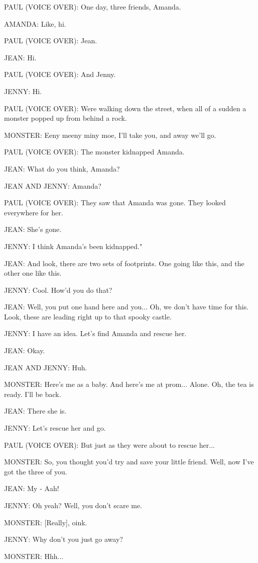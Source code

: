 PAUL (VOICE OVER):
One day, three friends, Amanda.

AMANDA:
Like, hi.

PAUL (VOICE OVER):
Jean.

JEAN:
Hi.

PAUL (VOICE OVER):
And Jenny.

JENNY:
Hi.

PAUL (VOICE OVER):
Were walking down the street, when all of a sudden a monster popped up from behind a rock.

MONSTER:
Eeny meeny miny moe, I'll take you, and away we'll go.

PAUL (VOICE OVER):
The monster kidnapped Amanda.

JEAN:
What do you think, Amanda?

JEAN AND JENNY:
Amanda?

PAUL (VOICE OVER):
They saw that Amanda was gone.
They looked everywhere for her.

JEAN:
She's gone.

JENNY:
I think Amanda's been kidnapped."

JEAN:
And look, there are two sets of footprints.
One going like this, and the other one like this.

JENNY:
Cool. How'd you do that?

JEAN:
Well, you put one hand here and you...
Oh, we don't have time for this.
Look, these are leading right up to that spooky castle.

JENNY:
I have an idea.
Let's find Amanda and rescue her.

JEAN:
Okay.

JEAN AND JENNY:
Huh.

MONSTER:
Here's me as a baby.
And here's me at prom... Alone.
Oh, the tea is ready.
I'll be back.

JEAN:
There she is.

JENNY:
Let's rescue her and go.

PAUL (VOICE OVER):
But just as they were about to rescue her...

MONSTER:
So, you thought you'd try and save your little friend.
Well, now I've got the three of you.

JEAN:
My - Aah!

JENNY:
Oh yeah?
Well, you don't scare me.

MONSTER:
[Really], oink.

JENNY:
Why don't you just go away?

MONSTER:
Hhh...

